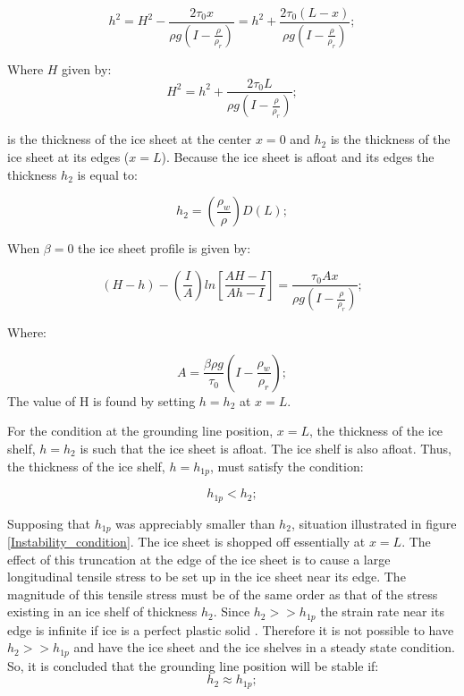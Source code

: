 \documentclass{article}
\begin{document}
\begin{equation}
	h^2=H^2-\frac{2\tau_0x}{\rho g(I-\frac{\rho}{\rho_r})}= h^2+\frac{2\tau_0(L-x)}{\rho g(I-\frac{\rho}{\rho_r})};
\end{equation}

Where $H$ given by:
\begin{equation}
	H^2=h^2+\frac{2\tau_0L}{\rho g(I-\frac{\rho}{\rho_r})};
\end{equation}

is the thickness of the ice sheet at the center $x=0$ and $h_2$ is the thickness of the ice sheet at its edges ($x=L$). Because the ice sheet is afloat and its edges the thickness $h_2$ is equal to:

\begin{equation}
	h_2=(\frac{\rho_w}{\rho})D(L);
\end{equation}

When $\beta=0$ the ice sheet profile is given by:

\begin{equation}
	(H-h)-(\frac{I}{A})ln[\frac{AH-I}{Ah-I}]=\frac{\tau_0 Ax}{\rho g(I-\frac{\rho}{\rho_r})};
\end{equation} 

Where:

\begin{equation}
	A=\frac{\beta \rho g}{\tau_0}(I-\frac{\rho_w}{\rho_r});
\end{equation}
The value of H is found by setting $h=h_2$ at $x=L$.

For the condition at the grounding line position, $x=L$, the thickness of the ice shelf, $h=h_2$ is such that the ice sheet is afloat. The ice shelf is also afloat. Thus, the thickness of the ice shelf, $h=h_{1p}$, must satisfy the condition:

\begin{equation}
	h_{1p}<h_2;
\end{equation}

Supposing that $h_{1p}$ was appreciably smaller than $h_2$, situation illustrated in figure \ref{Instability_condition}. The ice sheet is shopped off essentially at $x=L$. The effect of this truncation at the edge of the ice sheet is to cause a large longitudinal tensile stress to be set up in the ice sheet near its edge. The magnitude of this tensile stress must be of the same order as that of the stress existing in an ice shelf of thickness $h_2$. Since $h_2>>h_{1p}$ the strain rate near its edge is infinite if ice is a perfect plastic solid \cite{weertman1974stability}. Therefore it is not possible to have $h_2>>h_{1p}$ and have the ice sheet and the ice shelves in a steady state condition. So, it is concluded that the grounding line position will be stable if:
\begin{equation}
	h_2 \approx h_{1p};
\end{equation}
\end{document}
